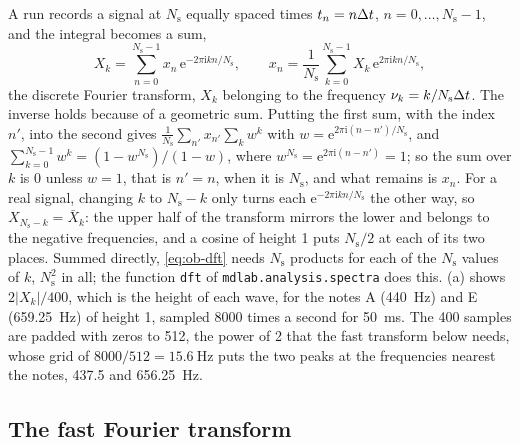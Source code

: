 A run records a signal at $N_{\mathrm s}$ equally spaced times $t_n =
n\Delta t$, $n = 0, \dots, N_{\mathrm s} - 1$, and the integral becomes a sum,
\begin{equation}
   X_k = \sum_{n=0}^{N_{\mathrm s}-1}x_n\,
   \mathrm{e}^{-2\pi\mathrm{i}kn/N_{\mathrm s}} , \qquad
   x_n = \frac{1}{N_{\mathrm s}}\sum_{k=0}^{N_{\mathrm s}-1}X_k\,
   \mathrm{e}^{2\pi\mathrm{i}kn/N_{\mathrm s}} ,
   \label{eq:ob-dft}
\end{equation}
the discrete Fourier transform, $X_k$ belonging to the frequency $\nu_k =
k/N_{\mathrm s}\Delta t$. The inverse holds because of a geometric sum.
Putting the first sum, with the index $n'$, into the second gives
$\frac{1}{N_{\mathrm s}}\sum_{n'}x_{n'}\sum_kw^k$ with $w =
\mathrm{e}^{2\pi\mathrm{i}(n - n')/N_{\mathrm s}}$, and $\sum_{k=0}^{N_{\mathrm
s}-1}w^k = (1 - w^{N_{\mathrm s}})/(1 - w)$, where $w^{N_{\mathrm s}} =
\mathrm{e}^{2\pi\mathrm{i}(n - n')} = 1$; so the sum over $k$ is 0 unless
$w = 1$, that is $n' = n$, when it is $N_{\mathrm s}$, and what remains is
$x_n$. For a real signal, changing $k$ to $N_{\mathrm s} - k$ only turns
each $\mathrm{e}^{-2\pi\mathrm{i}kn/N_{\mathrm s}}$ the other way, so
$X_{N_{\mathrm s}-k} = \bar X_k$: the upper half of the transform mirrors
the lower and belongs to the negative frequencies, and a cosine of height
1 puts $N_{\mathrm s}/2$ at each of its two places. Summed directly,
\cref{eq:ob-dft} needs $N_{\mathrm s}$ products for each of the
$N_{\mathrm s}$ values of $k$, $N_{\mathrm s}^2$ in all; the function
\texttt{dft} of \texttt{mdlab.analysis.spectra} does this.
(a) shows $2\lvert X_k\rvert/400$, which is the
height of each wave, for the notes A (\SI{440}{\hertz}) and E
(\SI{659.25}{\hertz}) of height 1, sampled 8000 times a second for
\SI{50}{\milli\second}. The 400 samples are padded with zeros to 512, the
power of 2 that the fast transform below needs, whose grid of $8000/512 =
\SI{15.6}{\hertz}$ puts the two peaks at the frequencies nearest the
notes, 437.5 and \SI{656.25}{\hertz}.

\subsection*{The fast Fourier transform}

